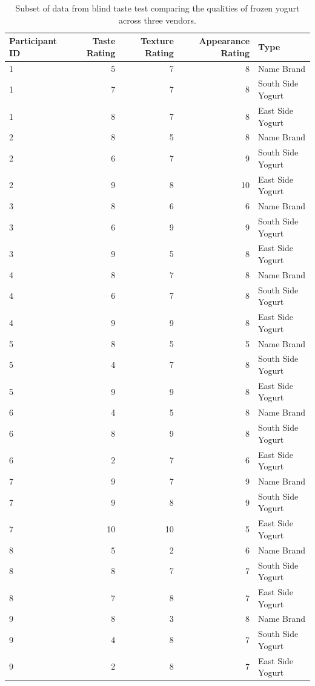 \documentclass[]{book}
\theoremstyle{plain}
\theoremstyle{mydefn}
\theoremstyle{myexmpl}
\theoremstyle{remark}
\begin{document}
\begin{table}

\caption{\label{tab:caseyogurt-table}Subset of data from blind taste test comparing the qualities of frozen yogurt across three vendors.}
\centering
\begin{tabular}[t]{l|r|r|r|l}
\hline
Participant ID & Taste Rating & Texture Rating & Appearance Rating & Type\\
\hline
1 & 5 & 7 & 8 & Name Brand\\
\hline
1 & 7 & 7 & 8 & South Side Yogurt\\
\hline
1 & 8 & 7 & 8 & East Side Yogurt\\
\hline
2 & 8 & 5 & 8 & Name Brand\\
\hline
2 & 6 & 7 & 9 & South Side Yogurt\\
\hline
2 & 9 & 8 & 10 & East Side Yogurt\\
\hline
3 & 8 & 6 & 6 & Name Brand\\
\hline
3 & 6 & 9 & 9 & South Side Yogurt\\
\hline
3 & 9 & 5 & 8 & East Side Yogurt\\
\hline
4 & 8 & 7 & 8 & Name Brand\\
\hline
4 & 6 & 7 & 8 & South Side Yogurt\\
\hline
4 & 9 & 9 & 8 & East Side Yogurt\\
\hline
5 & 8 & 5 & 5 & Name Brand\\
\hline
5 & 4 & 7 & 8 & South Side Yogurt\\
\hline
5 & 9 & 9 & 8 & East Side Yogurt\\
\hline
6 & 4 & 5 & 8 & Name Brand\\
\hline
6 & 8 & 9 & 8 & South Side Yogurt\\
\hline
6 & 2 & 7 & 6 & East Side Yogurt\\
\hline
7 & 9 & 7 & 9 & Name Brand\\
\hline
7 & 9 & 8 & 9 & South Side Yogurt\\
\hline
7 & 10 & 10 & 5 & East Side Yogurt\\
\hline
8 & 5 & 2 & 6 & Name Brand\\
\hline
8 & 8 & 7 & 7 & South Side Yogurt\\
\hline
8 & 7 & 8 & 7 & East Side Yogurt\\
\hline
9 & 8 & 3 & 8 & Name Brand\\
\hline
9 & 4 & 8 & 7 & South Side Yogurt\\
\hline
9 & 2 & 8 & 7 & East Side Yogurt\\
\hline
\end{tabular}
\end{table}
\end{document}
